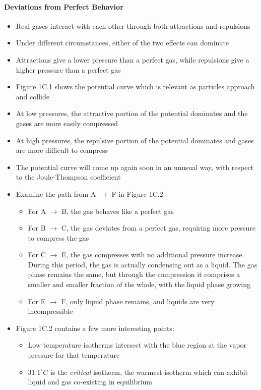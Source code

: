\documentclass[12pt, openany, letterpaper]{memoir}
\begin{document}
\paragraph{Deviations from Perfect Behavior}
\begin{itemize}
	\item Real gases interact with each other through both attractions and repulsions
	\item Under different circumstances, either of the two effects can dominate
	\item Attractions give a lower pressure than a perfect gas, while repulsions give a higher pressure than a perfect gas
	\item Figure 1C.1 shows the potential curve which is relevant as particles approach and collide
	\item At low pressures, the attractive portion of the potential dominates and the gases are more easily compressed
	\item At high pressures, the repulsive portion of the potential dominates and gases are more difficult to compress
	\item The potential curve will come up again soon in an unusual way, with respect to the Joule-Thompson coefficient
	\item Examine the path from A $\rightarrow$ F in Figure 1C.2
	\begin{itemize}
		\item For A $\rightarrow$ B, the gas behaves like a perfect gas
		\item For B $\rightarrow$ C, the gas deviates from a perfect gas, requiring more pressure to compress the gas
		\item For C $\rightarrow$ E, the gas compresses with no additional pressure increase. During this period, the gas is actually condensing out as a liquid. The gas phase remains the same, but through the compression it comprises a smaller and smaller fraction of the whole, with the liquid phase growing
		\item For E $\rightarrow$ F, only liquid phase remains, and liquids are very incompressible
 	\end{itemize}
 	\item Figure 1C.2 contains a few more interesting points:
 	\begin{itemize}
	 	\item Low temperature isotherms intersect with the blue region at the vapor pressure for that temperature
	 	\item $31.1^{\circ}C$ is the \emph{critical} isotherm, the warmest isotherm which can exhibit liquid and gas co-existing in equilibrium

\end{itemize}
\end{itemize}
\end{document}
